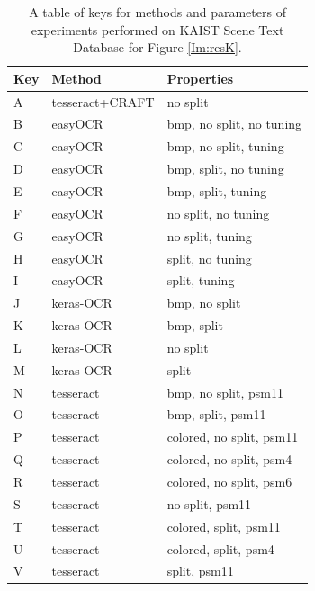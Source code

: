 \begin{table}[!ht]
    \centering
    \begin{tabular}{|l|l|l|}
    \hline
        Key & Method & Properties \\ \hline
        A & tesseract+CRAFT & no split \\ \hline
        B & easyOCR & bmp, no split, no tuning \\ 
        C & easyOCR & bmp, no split, tuning \\ 
        D & easyOCR & bmp, split, no tuning \\ 
        E & easyOCR & bmp, split, tuning \\ 
        F & easyOCR & no split, no tuning \\ 
        G & easyOCR & no split, tuning \\ 
        H & easyOCR & split, no tuning \\ 
        I & easyOCR & split, tuning \\ \hline
        J & keras-OCR & bmp, no split \\ 
        K & keras-OCR & bmp, split \\ 
        L & keras-OCR & no split \\ 
        M & keras-OCR & split \\ \hline
        N & tesseract & bmp, no split, psm11 \\ 
        O & tesseract & bmp, split, psm11 \\ 
        P & tesseract & colored, no split, psm11 \\ 
        Q & tesseract & colored, no split, psm4 \\ 
        R & tesseract & colored, no split, psm6 \\ 
        S & tesseract & no split, psm11 \\ 
        T & tesseract & colored, split, psm11 \\ 
        U & tesseract & colored, split, psm4 \\ 
        V & tesseract & split, psm11 \\ \hline
    \end{tabular}
    \caption{A table of keys for methods and parameters of experiments performed on KAIST Scene Text Database for Figure \ref*{Im:resK}.}
    \label{Tab:resK}
\end{table}




